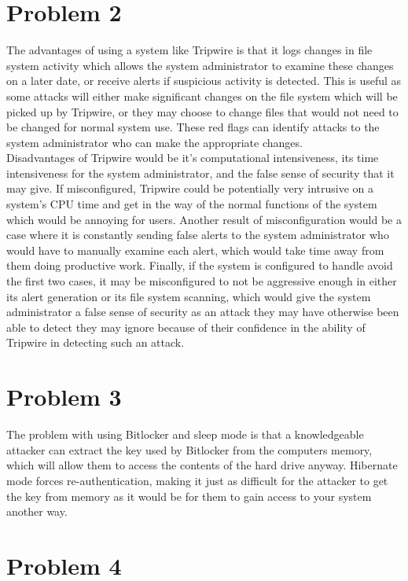 \documentclass{article}
\begin{document}
\section*{Problem 2}
The advantages of using a system like Tripwire is that it logs changes in file system activity which allows the system administrator to examine these changes on a later date, or receive alerts if suspicious activity is detected. This is useful as some attacks will either make significant changes on the file system which will be picked up by Tripwire, or they may choose to change files that would not need to be changed for normal system use. These red flags can identify attacks to the system administrator who can make the appropriate changes.\\
Disadvantages of Tripwire would be it's computational intensiveness, its time intensiveness for the system administrator, and the false sense of security that it may give. If misconfigured, Tripwire could be potentially very intrusive on a system's CPU time and get in the way of the normal functions of the system which would be annoying for users. Another result of misconfiguration would be a case where it is constantly sending false alerts to the system administrator who would have to manually examine each alert, which would take time away from them doing productive work. Finally, if the system is configured to handle avoid the first two cases, it may be misconfigured to not be aggressive enough in either its alert generation or its file system scanning, which would give the system administrator a false sense of security as an attack they may have otherwise been able to detect they may ignore because of their confidence in the ability of Tripwire in detecting such an attack.\\

\section*{Problem 3}
The problem with using Bitlocker and sleep mode is that a knowledgeable attacker can extract the key used by Bitlocker from the computers memory, which will allow them to access the contents of the hard drive anyway. Hibernate mode forces re-authentication, making it just as difficult for the attacker to get the key from memory as it would be for them to gain access to your system another way.\\

\section*{Problem 4}
\end{document}
